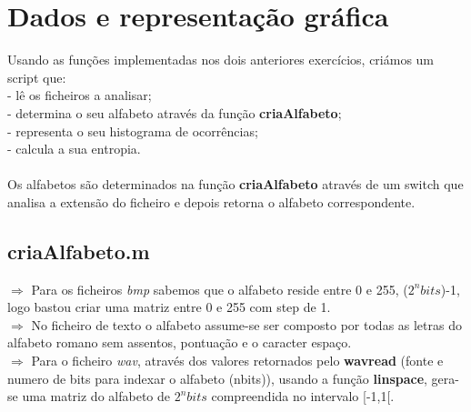 \documentclass{article}
\begin{document}
\newpage

\section{Dados e representação gráfica}

Usando  as funções implementadas nos dois anteriores exercícios, criámos um script que:\\
- lê os ficheiros a analisar;\\
- determina o seu alfabeto através da função \textbf{criaAlfabeto};\\
- representa o seu histograma de ocorrências;\\
- calcula a sua entropia.\\\\                    
Os alfabetos são determinados na função \textbf{criaAlfabeto} através de um switch que analisa a extensão do ficheiro e depois retorna o alfabeto correspondente.

\subsection{criaAlfabeto.m}

$\Rightarrow$ Para os ficheiros \textit{bmp} sabemos que o alfabeto reside entre 0 e 255, ($2^nbits$)-1, logo bastou criar uma matriz entre 0 e 255 com step de 1. \\
$\Rightarrow$ No ficheiro de texto o alfabeto assume-se ser composto por todas as letras do alfabeto romano sem assentos, pontuação e o caracter espaço.\\
$\Rightarrow$ Para o ficheiro \textit{wav}, através dos valores retornados pelo \textbf{wavread} (fonte e numero de bits para indexar o alfabeto (nbits)),  usando a função \textbf{linspace}, gera-se uma matriz do alfabeto de $2^nbits$ compreendida no  intervalo [-1,1[.\\
\end{document}
